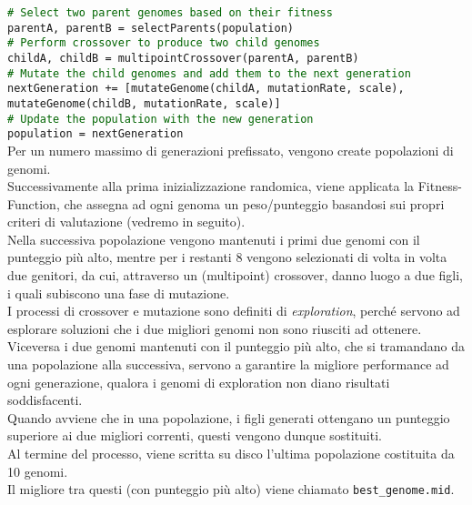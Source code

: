 \documentclass[a4paper,12pt]{report}
\begin{document}
\indent\indent            \texttt{\small\textcolor{darkgreen}{\# Select two parent genomes based on their fitness}} \\
\indent\indent            \texttt{\small parentA, parentB = selectParents(population)} \\
\indent\indent            \texttt{\small\textcolor{darkgreen}{\# Perform crossover to produce two child genomes}} \\
\indent\indent            \texttt{\small childA, childB = multipointCrossover(parentA, parentB)} \\
\indent\indent            \texttt{\small\textcolor{darkgreen}{\# Mutate the child genomes and add them to the next generation}} \\
\indent\indent            \texttt{\small nextGeneration += [mutateGenome(childA, mutationRate, scale),} \\
\indent\indent            \texttt{\small mutateGenome(childB, mutationRate, scale)]} \\

\indent        \texttt{\small\textcolor{darkgreen}{\# Update the population with the new generation}} \\
\indent        \texttt{\small population = nextGeneration} \\
        
Per un numero massimo di generazioni prefissato, vengono create popolazioni di genomi. \\
Successivamente alla prima inizializzazione randomica, viene applicata la Fitness-Function, che assegna ad ogni genoma un peso/punteggio basandosi sui propri criteri di valutazione (vedremo in seguito). \\
Nella successiva popolazione vengono mantenuti i primi due genomi con il punteggio più alto, mentre per i restanti 8 vengono selezionati di volta in volta due genitori, da cui, attraverso un (multipoint) crossover, danno luogo a due figli, i quali subiscono una fase di mutazione. \\
I processi di crossover e mutazione sono definiti di \textit{exploration}, perché servono ad esplorare soluzioni che i due migliori genomi non sono riusciti ad ottenere. \\
Viceversa i due genomi mantenuti con il punteggio più alto, che si tramandano da una popolazione alla successiva, servono a garantire la migliore performance ad ogni generazione, qualora i genomi di exploration non diano risultati soddisfacenti. \\
Quando avviene che in una popolazione, i figli generati ottengano un punteggio superiore ai due migliori correnti, questi vengono dunque sostituiti. \\
Al termine del processo, viene scritta su disco l'ultima popolazione costituita da 10 genomi. \\
Il migliore tra questi (con punteggio più alto) viene chiamato \texttt{best\_genome.mid}. 
\end{document}
